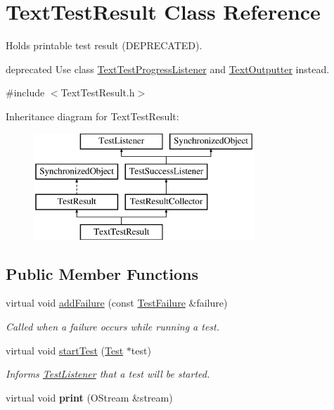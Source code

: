 \hypertarget{class_text_test_result}{\section{Text\-Test\-Result Class Reference}
\label{class_text_test_result}
}


Holds printable test result (D\-E\-P\-R\-E\-C\-A\-T\-E\-D).

deprecated Use class \hyperlink{class_text_test_progress_listener}{Text\-Test\-Progress\-Listener} and \hyperlink{class_text_outputter}{Text\-Outputter} instead.  




{\ttfamily \#include $<$Text\-Test\-Result.\-h$>$}

Inheritance diagram for Text\-Test\-Result\-:\begin{figure}[H]
\begin{center}
\leavevmode
\includegraphics[height=4.000000cm]{class_text_test_result}
\end{center}
\end{figure}
\subsection*{Public Member Functions}
\begin{DoxyCompactItemize}
\item 
virtual void \hyperlink{class_text_test_result_a05d3b0e8e51b3430092166bbc3d17708}{add\-Failure} (const \hyperlink{class_test_failure}{Test\-Failure} \&failure)
\begin{DoxyCompactList}\small\item\em Called when a failure occurs while running a test. \end{DoxyCompactList}\item 
\hypertarget{class_text_test_result_a2191f5e916fca83151fb657b31dcd30d}{virtual void \hyperlink{class_text_test_result_a2191f5e916fca83151fb657b31dcd30d}{start\-Test} (\hyperlink{class_test}{Test} $\ast$test)}\label{class_text_test_result_a2191f5e916fca83151fb657b31dcd30d}

\begin{DoxyCompactList}\small\item\em Informs \hyperlink{class_test_listener}{Test\-Listener} that a test will be started. \end{DoxyCompactList}\item 
\hypertarget{class_text_test_result_a35fdfec0767de9f4c4fa0e319dfedb3b}{virtual void {\bfseries print} (O\-Stream \&stream)}\label{class_text_test_result_a35fdfec0767de9f4c4fa0e319dfedb3b}

\end{DoxyCompactItemize}
